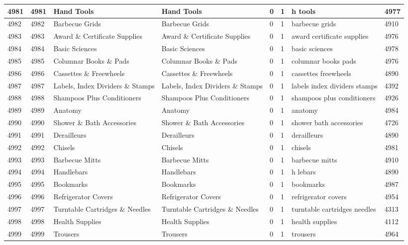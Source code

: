 \begin{longtable}{|l|l|l|l|l|l|l|l|}
4981 & 4981 & Hand Tools & Hand Tools & 0 & 1 & h tools & 4977 \\ \hline 
4982 & 4982 & Barbecue Grids & Barbecue Grids & 0 & 1 & barbecue grids & 4910 \\ \hline 
4983 & 4983 & Award \& Certificate Supplies & Award \& Certificate Supplies & 0 & 1 & award certificate supplies & 4976 \\ \hline 
4984 & 4984 & Basic Sciences & Basic Sciences & 0 & 1 & basic sciences & 4978 \\ \hline 
4985 & 4985 & Columnar Books \& Pads & Columnar Books \& Pads & 0 & 1 & columnar books pads & 4976 \\ \hline 
4986 & 4986 & Cassettes \& Freewheels & Cassettes \& Freewheels & 0 & 1 & cassettes freewheels & 4890 \\ \hline 
4987 & 4987 & Labels, Index Dividers \& Stamps & Labels, Index Dividers \& Stamps & 0 & 1 & labels index dividers stamps & 4392 \\ \hline 
4988 & 4988 & Shampoos Plus Conditioners & Shampoos Plus Conditioners & 0 & 1 & shampoos plus conditioners & 4926 \\ \hline 
4989 & 4989 & Anatomy & Anatomy & 0 & 1 & anatomy & 4984 \\ \hline 
4990 & 4990 & Shower \& Bath Accessories & Shower \& Bath Accessories & 0 & 1 & shower bath accessories & 4726 \\ \hline 
4991 & 4991 & Derailleurs & Derailleurs & 0 & 1 & derailleurs & 4890 \\ \hline 
4992 & 4992 & Chisels & Chisels & 0 & 1 & chisels & 4981 \\ \hline 
4993 & 4993 & Barbecue Mitts & Barbecue Mitts & 0 & 1 & barbecue mitts & 4910 \\ \hline 
4994 & 4994 & Handlebars & Handlebars & 0 & 1 & h lebars & 4890 \\ \hline 
4995 & 4995 & Bookmarks & Bookmarks & 0 & 1 & bookmarks & 4987 \\ \hline 
4996 & 4996 & Refrigerator Covers & Refrigerator Covers & 0 & 1 & refrigerator covers & 4954 \\ \hline 
4997 & 4997 & Turntable Cartridges \& Needles & Turntable Cartridges \& Needles & 0 & 1 & turntable cartridges needles & 4313 \\ \hline 
4998 & 4998 & Health Supplies & Health Supplies & 0 & 1 & health supplies & 4112 \\ \hline 
4999 & 4999 & Trousers & Trousers & 0 & 1 & trousers & 4964 \\ \hline 

\end{longtable}
